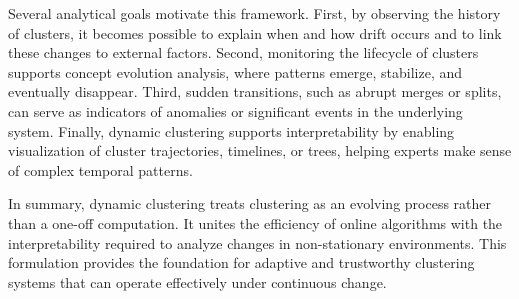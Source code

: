 Several analytical goals motivate this framework. First, by observing the
history of clusters, it becomes possible to explain when and how drift occurs
and to link these changes to external factors. Second, monitoring the lifecycle
of clusters supports concept evolution analysis, where patterns emerge,
stabilize, and eventually disappear. Third, sudden transitions, such as abrupt
merges or splits, can serve as indicators of anomalies or significant events in
the underlying system. Finally, dynamic clustering supports interpretability by
enabling visualization of cluster trajectories, timelines, or trees, helping
experts make sense of complex temporal patterns.

In summary, dynamic clustering treats clustering as an evolving process rather
than a one-off computation. It unites the efficiency of online algorithms with
the interpretability required to analyze changes in non-stationary
environments. This formulation provides the foundation for adaptive and
trustworthy clustering systems that can operate effectively under continuous
change.

